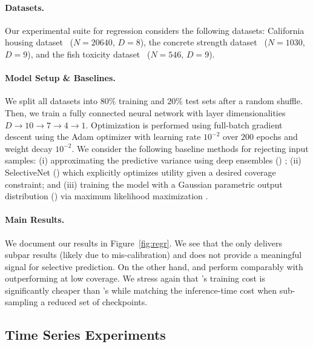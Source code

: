 \paragraph{Datasets.} Our experimental suite for regression considers the following datasets: %
California housing dataset~\citep{pace1997sparse} ($N=20640$, $D=8$), the concrete strength dataset~\citep{misc_concrete_compressive_strength_165} ($N=1030$, $D=9$), and the fish toxicity dataset~\citep{misc_qsar_fish_toxicity_504} ($N=546$, $D=9$). 

\paragraph{Model Setup \& Baselines.} We split all datasets into $80\%$ training and $20\%$ test sets after a random shuffle. Then, we train a fully connected neural network with layer dimensionalities $D \rightarrow 10 \rightarrow 7 \rightarrow 4 \rightarrow 1$. Optimization is performed using full-batch gradient descent using the Adam optimizer with learning rate $10^{-2}$ over $200$ epochs and weight decay $10^{-2}$. We consider the following baseline methods for rejecting input samples: (i) approximating the predictive variance using deep ensembles (\de) \citep{balaji2017uncertainty, zaoui2020regression}; (ii) SelectiveNet (\sn) which explicitly optimizes utility given a desired coverage constraint; and (iii) training the model with a Gaussian parametric output distribution (\odist) via maximum likelihood maximization \citep{alexandrov2019gluonts}.

\paragraph{Main Results.} We document our results in Figure~\ref{fig:regr}. We see that the \odist only delivers subpar results (likely due to mis-calibration) and does not provide a meaningful signal for selective prediction. On the other hand, \de and \sptd perform comparably with \sptd outperforming \de at low coverage. We stress again that \sptd's training cost is significantly cheaper than \de's while matching the inference-time cost when sub-sampling a reduced set of checkpoints. 

\subsection{Time Series Experiments}
\label{sec:ts_exp}

